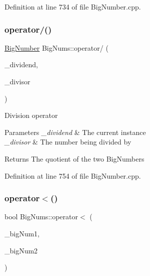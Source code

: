 Definition at line 734 of file Big\+Number.\+cpp.

\mbox{\label{namespace_big_nums_a5f3c743438ecf988d979eceb658f9cf9}} 
\subsubsection{\texorpdfstring{operator/()}{operator/()}}
{\footnotesize\ttfamily \mbox{\hyperlink{class_big_nums_1_1_big_number}{Big\+Number}} Big\+Nums\+::operator/ (\begin{DoxyParamCaption}\item[{\mbox{\hyperlink{class_big_nums_1_1_big_number}{Big\+Number}}}]{\+\_\+dividend,  }\item[{const \mbox{\hyperlink{class_big_nums_1_1_big_number}{Big\+Number}} \&}]{\+\_\+divisor }\end{DoxyParamCaption})}

Division operator 
\begin{DoxyParams}{Parameters}
{\em \+\_\+dividend} & The current instance \\
\hline
{\em \+\_\+divisor} & The number being divided by \\
\hline
\end{DoxyParams}
\begin{DoxyReturn}{Returns}
The quotient of the two Big\+Numbers 
\end{DoxyReturn}


Definition at line 754 of file Big\+Number.\+cpp.

\mbox{\label{namespace_big_nums_a3d130669f3794613ae13100178f0758c}} 
\subsubsection{\texorpdfstring{operator$<$()}{operator<()}}
{\footnotesize\ttfamily bool Big\+Nums\+::operator$<$ (\begin{DoxyParamCaption}\item[{const \mbox{\hyperlink{class_big_nums_1_1_big_number}{Big\+Number}} \&}]{\+\_\+big\+Num1,  }\item[{const \mbox{\hyperlink{class_big_nums_1_1_big_number}{Big\+Number}} \&}]{\+\_\+big\+Num2 }\end{DoxyParamCaption})}

